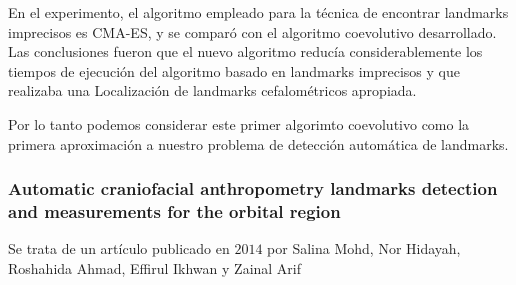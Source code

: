                 \noindent En el experimento, el algoritmo empleado para la técnica de encontrar landmarks imprecisos es CMA-ES, y se comparó con el algoritmo coevolutivo desarrollado. Las conclusiones fueron que el nuevo algoritmo reducía considerablemente los tiempos de ejecución del algoritmo basado en landmarks imprecisos y que realizaba una Localización de landmarks cefalométricos apropiada. 
                
                \medskip

                \noindent Por lo tanto podemos considerar este primer algorimto coevolutivo como la primera aproximación a nuestro problema de detección automática de landmarks.

            \subsubsection{Automatic craniofacial anthropometry landmarks detection and measurements for the orbital region}
                \noindent Se trata de un artículo publicado en $2014$ por Salina Mohd, Nor Hidayah, Roshahida Ahmad, Effirul Ikhwan y Zainal Arif \cite{asi2014automatic}








\endinput

